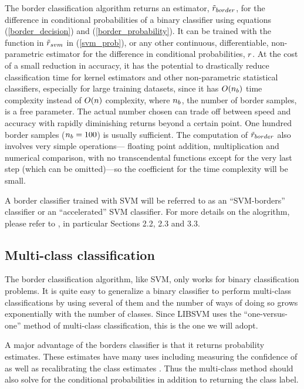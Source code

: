 The border classification algorithm returns an estimator,
$\tilde r_{border}$, for the difference in conditional probabilities of
a binary classifier using
equations (\ref{border_decision}) and (\ref{border_probability}).
It can be trained with the function in $\tilde r_{svm}$ in (\ref{svm_prob}),
or any other 
continuous, differentiable, non-parametric estimator for the difference
in conditional probabilities, $r$.
At the cost of a small reduction in accuracy,
it has the potential to drastically reduce classification time for kernel
estimators and other non-parametric statistical classifiers,
especially for large training datasets,
since it has $O(n_b)$ time complexity instead of $O(n)$
complexity, where $n_b$, the number of border samples, is a free parameter.
The actual number chosen
can trade off between speed and accuracy with rapidly diminishing returns
beyond a certain point. 
One hundred border samples ($n_b=100$) is usually sufficient.
The computation of $\tilde r_{border}$ also involves very simple operations---
floating point addition, multiplication and numerical comparison, with no
transcendental functions except for the very last step (which can be omitted)---so the coefficient for the time complexity will be small.

A border classifier trained with SVM will be referred to as an
``SVM-borders'' classifier or an ``accelerated'' SVM classifier.
For more details on the alogrithm, please refer to \citet{Mills2011},
in particular Sections 2.2, 2.3 and 3.3.

\subsection{Multi-class classification}

The border classification algorithm, like SVM, only works for binary 
classification problems. It is quite easy to generalize a binary classifier
to perform multi-class classifications by using several of them and the
number of ways of doing so grows exponentially with the number of classes.
Since LIBSVM uses the ``one-versus-one'' method \citep{Hsu_Lin2002} of 
multi-class classification, this is the one we will adopt. 

A major advantage of the
borders classifier is that it returns probability estimates.
These estimates have many uses including measuring the confidence of as well
as recalibrating the class estimates \citep{Mills2009,Mills2011}.
Thus the multi-class method
should also solve for the conditional probabilities in addition to returning
the class label.

